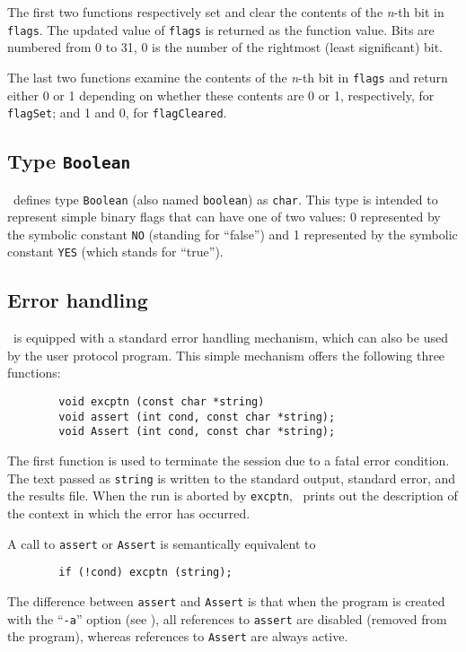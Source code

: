 The first two functions respectively set and clear
the contents of the {\em n\/}-th bit in {\tt flags}.
The updated value of {\tt flags} is returned as the function value.
Bits are numbered from 0 to
31, 0 is the number of the rightmost (least significant) bit.

The last two
functions examine the contents of the {\em n\/}-th bit in {\tt flags} and return
either 0 or 1 depending on whether these contents are 0 or 1,
respectively, for {\tt flagSet}; and 1 and 0, for {\tt flagCleared}.

\subsection{Type {\tt Boolean}}
\label{rm_au_tb}

\smurph\ defines type {\tt Boolean} (also named {\tt boolean}) as {\tt char}.
This type is intended to represent simple binary flags that can have one
of two values: 0 represented by the symbolic constant {\tt NO} (standing for
``false'') and 1 represented by the symbolic constant {\tt YES} (which stands
for ``true'').

\subsection{Error handling}
\label{rm_au_eh}

\smurph\ is equipped with a standard error handling mechanism, which can also
be used by the user protocol program.
This simple mechanism offers the following three functions:
\begin{verbatim}
        void excptn (const char *string)
        void assert (int cond, const char *string);
        void Assert (int cond, const char *string);
\end{verbatim}

The first function is used to terminate the session due to a fatal error
condition. The text passed as {\tt string} is written to the standard
output, standard error, and the results file.
When the run is aborted by {\tt excptn}, \smurph\ prints out the
description of the context in which the error has occurred.

A call to {\tt assert} or {\tt Assert} is semantically equivalent to
\begin{verbatim}
        if (!cond) excptn (string);
\end{verbatim}
The difference between {\tt assert} and {\tt Assert} is that
when the program is created with the ``{\tt -a}'' option (see
), all references to {\tt assert} are disabled (removed
from the program), whereas references to {\tt Assert} are always
active.

